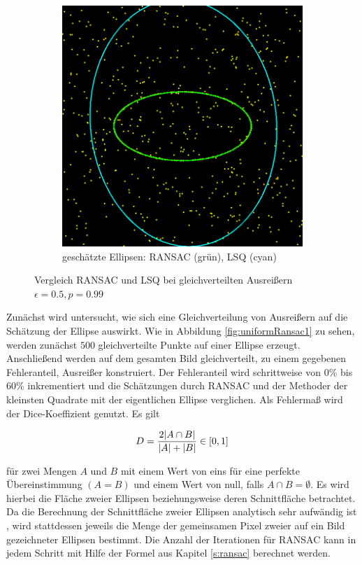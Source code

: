 {\begin{figure}[!htb]
\begin{subfigure}{.5\textwidth}
		\includegraphics[width=.9\textwidth]{images/ransac50_1.png}
		\caption{geschätzte Ellipsen: RANSAC (grün), LSQ (cyan)}
		\label{fig:uniformRansac2}
	\end{subfigure}
	\label{fig:uniformRansac}
	\caption{Vergleich RANSAC und LSQ bei gleichverteilten Ausreißern $\epsilon = 0.5, p = 0.99$}
\end{figure}

Zunächst wird untersucht, wie sich eine Gleichverteilung von Ausreißern auf die Schätzung der Ellipse auswirkt. Wie in Abbildung \ref{fig:uniformRansac1} zu sehen, werden zunächst $500$ gleichverteilte Punkte auf einer Ellipse erzeugt. 
Anschließend werden auf dem gesamten Bild gleichverteilt, zu einem gegebenen Fehleranteil, Ausreißer konstruiert. Der Fehleranteil wird schrittweise von 0\% bis 60\% inkrementiert und die Schätzungen durch RANSAC und der Methoder der kleinsten Quadrate mit der eigentlichen Ellipse verglichen. Als Fehlermaß wird der Dice-Koeffizient \cite{Dice1945} genutzt. Es gilt

\[
	D = \frac{2\lvert A\cap B\rvert}{\lvert A\rvert + \lvert B\rvert} \in [0, 1]
\]

für zwei Mengen $A$ und $B$ mit einem Wert von eins für eine perfekte Übereinstimmung $(A = B)$ und einem Wert von null, falls $A\cap B = \emptyset$. Es wird hierbei die Fläche zweier Ellipsen beziehungsweise deren Schnittfläche betrachtet. Da die Berechnung der Schnittfläche zweier Ellipsen analytisch sehr aufwändig ist \cite{Eberly2008}, wird stattdessen jeweils die Menge der gemeinsamen Pixel zweier auf ein Bild gezeichneter Ellipsen bestimmt.
Die Anzahl der Iterationen für RANSAC kann in jedem Schritt mit Hilfe der Formel aus Kapitel \ref{s:ransac} berechnet werden.

}
